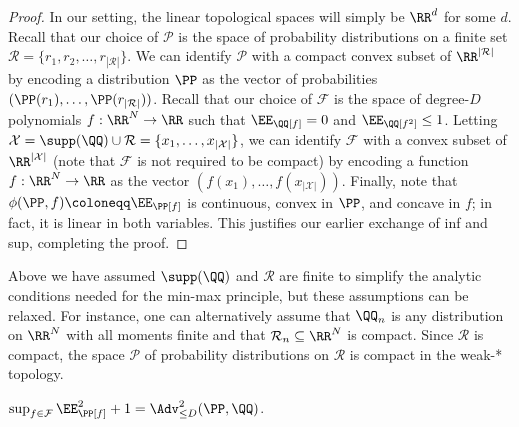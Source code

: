 \documentclass{article}
\begin{document}
\begin{proof}
\noindent In our setting, the linear topological spaces will simply be $\RR^d$ for some $d$. Recall that our choice of $\mathcal{P}$ is the space of probability distributions on a finite set $\mathcal{R} = \{r_1,r_2,\ldots,r_{|\mathcal{R}|}\}$. We can identify $\mathcal{P}$ with a compact convex subset of $\RR^{|\mathcal{R}|}$ by encoding a distribution $\PP$ as the vector of probabilities $(\PP(r_1),\ldots,\PP(r_{|\mathcal{R}|}))$. Recall that our choice of $\mathcal{F}$ is the space of degree-$D$ polynomials $f: \RR^N \to \RR$ such that $\EE_\QQ[f] = 0$ and $\EE_\QQ[f^2] \le 1$. Letting $\mathcal{X} = \supp(\QQ) \cup \mathcal{R} = \{x_1,\ldots,x_{|\mathcal{X}|}\}$, we can identify $\mathcal{F}$ with a convex subset of $\RR^{|\mathcal{X}|}$ (note that $\mathcal{F}$ is not required to be compact) by encoding a function $f: \RR^N \to \RR$ as the vector $(f(x_1),\ldots,f(x_{|\mathcal{X}|}))$. Finally, note that $\phi(\PP,f) \coloneqq \EE_\PP[f]$ is continuous, convex in $\PP$, and concave in $f$; in fact, it is linear in both variables. This justifies our earlier exchange of inf and sup, completing the proof.
\end{proof}

\begin{remark}\label{rem:compact}
Above we have assumed $\supp(\QQ)$ and $\mathcal{R}$ are finite to simplify the analytic conditions needed for the min-max principle, but these assumptions can be relaxed. For instance, one can alternatively assume that $\QQ_n$ is any distribution on $\RR^N$ with all moments finite and that $\mathcal{R}_n \subseteq \RR^N$ is compact. Since $\mathcal{R}$ is compact, the space $\mathcal{P}$ of probability distributions on $\mathcal{R}$ is compact in the weak-* topology.
\end{remark}

\begin{lemma}\label{lem:adv-mean}
$\sup_{f \in \mathcal{F}} \EE_\PP[f]^2 + 1 = \Adv_{\le D}^2(\PP,\QQ)$.
\end{lemma}
\end{document}
